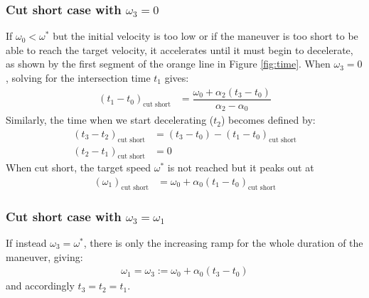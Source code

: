 \documentclass[12pt, a4paper]
{article}
\providecommand{\lr}[1]{\left(#1\right)}
\providecommand{\sub}[1]{_{\text{#1}}}
\providecommand{\w}{\omega}
\providecommand{\wt}{\w^*}
\renewcommand{\a}{\alpha}
\begin{document}
\subsubsection{Cut short case with $\w_3 = 0$}
\label{sec:t:cutshort}
If $\w_0 < \wt$ but the initial velocity is too low or if the
maneuver is too short to be able to reach the target velocity, it accelerates
until it must begin to decelerate, as shown by the first segment of the orange
line in Figure \ref{fig:time}. When $\w_3 = 0$,
solving for the intersection time $t_1$ gives:
%
\begin{align}
    \label{eq:t:t1mt0:cutshort}
    \lr{t_1 - t_0}\sub{cut short} &=
        \dfrac{\w_0 + \a_2(t_3-t_0)}{\a_2-\a_0}
\end{align}
%
Similarly, the time when we start decelerating ($t_2$) becomes defined by:
%
\begin{align}
    \label{eq:t:t3mt2:cutshort}
    \lr{t_3 - t_2}\sub{cut short} &= (t_3 - t_0) - (t_1 - t_0)\sub{cut short}
    \\[1em]
    \label{eq:t:t2mt1:cutshort}
    \lr{t_2 - t_1}\sub{cut short} &= 0
\end{align}
%
When cut short, the target speed $\wt$ is not reached but it peaks out at
%
\begin{align}
    \lr{\w_1}\sub{cut short} &= \w_0 + \a_0(t_1 - t_0)\sub{cut short}
\end{align}

\subsubsection{Cut short case with $\w_3 = \w_1$}
\label{sec:t:cutshort}

If instead $\w_3 = \wt$, there is only the increasing ramp for the whole
duration of the maneuver, giving:
%
\begin{align}
    \w_1 = \w_3 := \w_0 + \a_0(t_3 - t_0)
\end{align}
%
and accordingly $t_3=t_2=t_1$.
\end{document}
